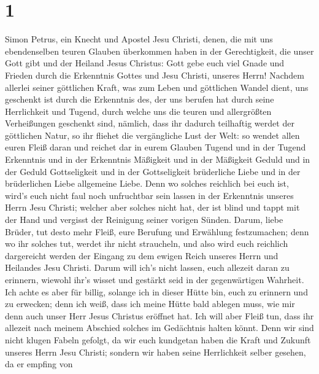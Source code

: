 \hypertarget{section}{%
\section{1}\label{section}}

 Simon Petrus, ein Knecht und Apostel Jesu Christi, denen,
die mit uns ebendenselben teuren Glauben überkommen haben in der
Gerechtigkeit, die unser Gott gibt und der Heiland Jesus Christus:
 Gott gebe euch viel Gnade und Frieden durch die
Erkenntnis Gottes und Jesu Christi, unseres Herrn! 
Nachdem allerlei seiner göttlichen Kraft, was zum Leben und göttlichen
Wandel dient, uns geschenkt ist durch die Erkenntnis des, der uns
berufen hat durch seine Herrlichkeit und Tugend,  durch
welche uns die teuren und allergrößten Verheißungen geschenkt sind,
nämlich, dass ihr dadurch teilhaftig werdet der göttlichen Natur, so ihr
fliehet die vergängliche Lust der Welt:  so wendet allen
euren Fleiß daran und reichet dar in eurem Glauben Tugend und in der
Tugend Erkenntnis  und in der Erkenntnis Mäßigkeit und in
der Mäßigkeit Geduld und in der Geduld Gottseligkeit  und
in der Gottseligkeit brüderliche Liebe und in der brüderlichen Liebe
allgemeine Liebe.  Denn wo solches reichlich bei euch ist,
wird's euch nicht faul noch unfruchtbar sein lassen in der Erkenntnis
unseres Herrn Jesu Christi;  welcher aber solches nicht
hat, der ist blind und tappt mit der Hand und vergisst der Reinigung
seiner vorigen Sünden.  Darum, liebe Brüder, tut desto
mehr Fleiß, eure Berufung und Erwählung festzumachen; denn wo ihr
solches tut, werdet ihr nicht straucheln,  und also wird
euch reichlich dargereicht werden der Eingang zu dem ewigen Reich
unseres Herrn und Heilandes Jesu Christi.  Darum will
ich's nicht lassen, euch allezeit daran zu erinnern, wiewohl ihr's
wisset und gestärkt seid in der gegenwärtigen Wahrheit. 
Ich achte es aber für billig, solange ich in dieser Hütte bin, euch zu
erinnern und zu erwecken;  denn ich weiß, dass ich meine
Hütte bald ablegen muss, wie mir denn auch unser Herr Jesus Christus
eröffnet hat.  Ich will aber Fleiß tun, dass ihr allezeit
nach meinem Abschied solches im Gedächtnis halten könnt. 
Denn wir sind nicht klugen Fabeln gefolgt, da wir euch kundgetan haben
die Kraft und Zukunft unseres Herrn Jesu Christi; sondern wir haben
seine Herrlichkeit selber gesehen,  da er empfing von
